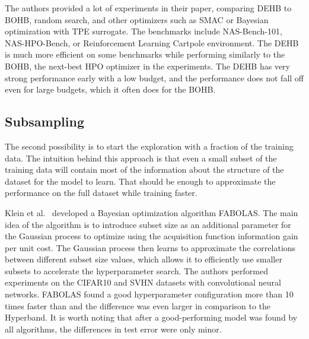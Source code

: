 
The authors provided a lot of experiments in their paper, comparing DEHB to BOHB, random search, and other optimizers such as SMAC or Bayesian optimization with TPE surrogate. The benchmarks include NAS-Bench-101, NAS-HPO-Bench, or Reinforcement Learning Cartpole environment. The DEHB is much more efficient on some benchmarks while performing similarly to the BOHB, the next-best HPO optimizer in the experiments. The DEHB has very strong performance early with a low budget, and the performance does not fall off even for large budgets, which it often does for the BOHB.


\subsection{Subsampling}
The second possibility is to start the exploration with a fraction of the training data. The intuition behind this approach is that even a small subset of the training data will contain most of the information about the structure of the dataset for the model to learn. That should be enough to approximate the performance on the full dataset while training faster.

Klein et al.~\cite{klein2017fast} developed a Bayesian optimization algorithm FABOLAS. The main idea of the algorithm is to introduce subset size as an additional parameter for the Gaussian process to optimize using the acquisition function information gain per unit cost. The Gaussian process then learns to approximate the correlations between different subset size values, which allows it to efficiently use smaller subsets to accelerate the hyperparameter search. The authors performed experiments on the CIFAR10 and SVHN datasets with convolutional neural networks. FABOLAS found a good hyperparameter configuration more than 10 times faster than  and the difference was even larger in comparison to the Hyperband. It is worth noting that after a good-performing model was found by all algorithms, the differences in test error were only minor.

